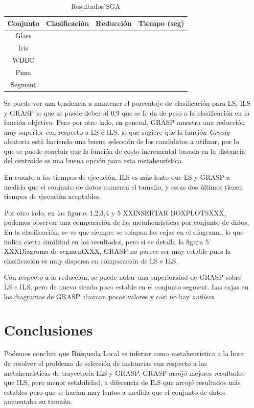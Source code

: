 \documentclass{ci5652}
\begin{document}
\begin{table}[!h]
	\centering
	\begin{tabular}{c c c c}
	\hline
	Conjunto & Clasificación & Reducción & Tiempo (seg) \\
	\hline
	Glass & & & \\
	Iris & & & \\
	WDBC & & & \\
	Pima & & & \\
	Segment & & & \\
	\end{tabular}
	\caption{Resultados SGA}
	\label{table:sga-result}
\end{table}


Se puede ver una tendencia a mantener el porcentaje de clasificación para LS, ILS y GRASP lo que se puede deber al 0.9 que se le da de peso a la clasificación en la función objetivo. Pero por otro lado, en general, GRASP muestra una reducción muy superior con respecto a LS e ILS, lo que sugiere que la función \textit{Greedy} aleatoria está haciendo una buena selección de los candidatos a utilizar, por lo que se puede concluir que la función de costo incremental basada en la distancia del centroide es una buena opción para esta metaheurística.

En cuanto a los tiempos de ejecución, ILS es más lento que LS y GRASP a medida que el conjunto de datos aumenta el tamaño, y estas dos últimos tienen tiempos de ejecución aceptables.

Por otro lado, en las figuras 1,2,3,4 y 5 XXINSERTAR BOXPLOTSXXX, podemos observar una comparación de las metaheurísticas por conjunto de datos. En la clasificación, se ve que siempre se solapan las cajas en el diagrama, lo que indica cierta similitud en los resultados, pero si se detalla la figura 5 XXXDiagrama de segmentXXX, GRASP no parece ser muy estable pues la clasificación es muy dispersa en comparación de LS e ILS. 

Con respecto a la reducción, se puede notar una superioridad de GRASP sobre LS e ILS, pero de nuevo siendo poco estable en el conjunto segment. Las cajas en los diagramas de GRASP abarcan pocos valores y casi no hay \textit{outliers}.



\section*{Conclusiones}

Podemos concluir que Búsqueda Local es inferior como metaheurística a la hora de resolver el problema de selección de instancias con respecto a las metaheurísticas de trayectoria ILS y GRASP. GRASP arrojó mejores resultados que ILS, pero menor estabilidad, a diferencia de ILS que arrojó resultados más estables pero que se hacían muy lentos a medida que el conjunto de datos aumentaba su tamaño.
\end{document}
